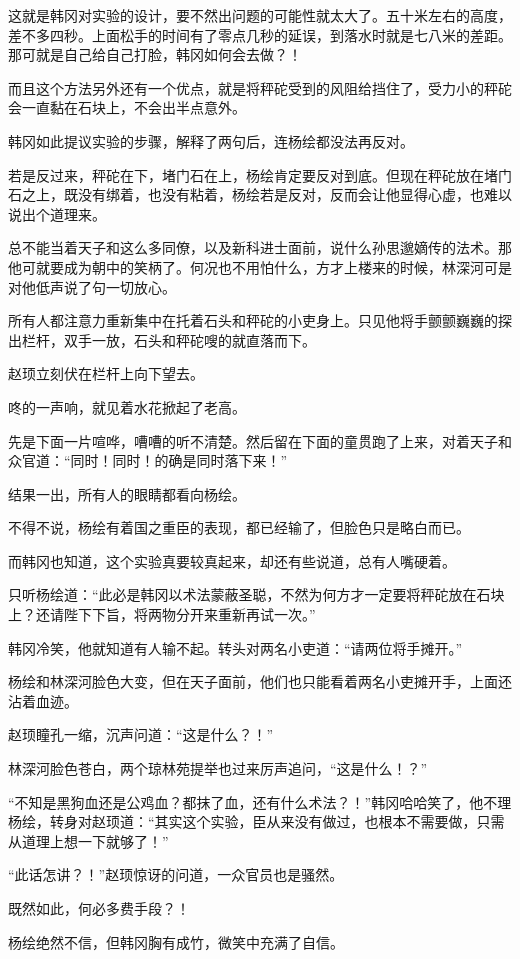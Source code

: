 这就是韩冈对实验的设计，要不然出问题的可能性就太大了。五十米左右的高度，差不多四秒。上面松手的时间有了零点几秒的延误，到落水时就是七八米的差距。那可就是自己给自己打脸，韩冈如何会去做？！

而且这个方法另外还有一个优点，就是将秤砣受到的风阻给挡住了，受力小的秤砣会一直黏在石块上，不会出半点意外。

韩冈如此提议实验的步骤，解释了两句后，连杨绘都没法再反对。

若是反过来，秤砣在下，堵门石在上，杨绘肯定要反对到底。但现在秤砣放在堵门石之上，既没有绑着，也没有粘着，杨绘若是反对，反而会让他显得心虚，也难以说出个道理来。

总不能当着天子和这么多同僚，以及新科进士面前，说什么孙思邈嫡传的法术。那他可就要成为朝中的笑柄了。何况也不用怕什么，方才上楼来的时候，林深河可是对他低声说了句一切放心。

所有人都注意力重新集中在托着石头和秤砣的小吏身上。只见他将手颤颤巍巍的探出栏杆，双手一放，石头和秤砣嗖的就直落而下。

赵顼立刻伏在栏杆上向下望去。

咚的一声响，就见着水花掀起了老高。

先是下面一片喧哗，嘈嘈的听不清楚。然后留在下面的童贯跑了上来，对着天子和众官道：“同时！同时！的确是同时落下来！”

结果一出，所有人的眼睛都看向杨绘。

不得不说，杨绘有着国之重臣的表现，都已经输了，但脸色只是略白而已。

而韩冈也知道，这个实验真要较真起来，却还有些说道，总有人嘴硬着。

只听杨绘道：“此必是韩冈以术法蒙蔽圣聪，不然为何方才一定要将秤砣放在石块上？还请陛下下旨，将两物分开来重新再试一次。”

韩冈冷笑，他就知道有人输不起。转头对两名小吏道：“请两位将手摊开。”

杨绘和林深河脸色大变，但在天子面前，他们也只能看着两名小吏摊开手，上面还沾着血迹。

赵顼瞳孔一缩，沉声问道：“这是什么？！”

林深河脸色苍白，两个琼林苑提举也过来厉声追问，“这是什么！？”

“不知是黑狗血还是公鸡血？都抹了血，还有什么术法？！”韩冈哈哈笑了，他不理杨绘，转身对赵顼道：“其实这个实验，臣从来没有做过，也根本不需要做，只需从道理上想一下就够了！”

“此话怎讲？！”赵顼惊讶的问道，一众官员也是骚然。

既然如此，何必多费手段？！

杨绘绝然不信，但韩冈胸有成竹，微笑中充满了自信。

